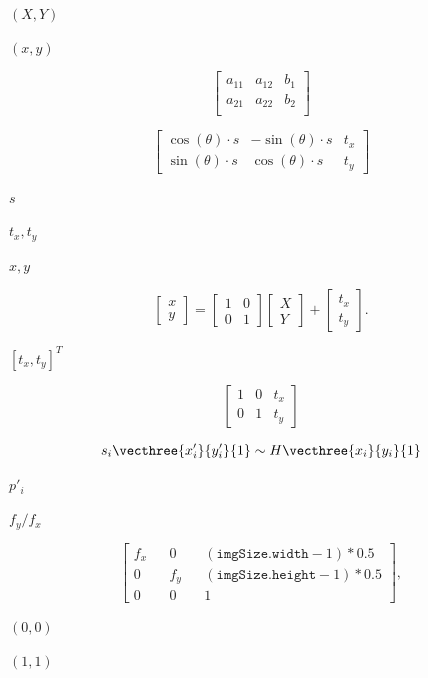 \documentclass{article}
\begin{document}
$(X,Y)$
\pagebreak

$(x,y)$
\pagebreak

\[\begin{bmatrix}
a_{11} & a_{12} & b_1\\
a_{21} & a_{22} & b_2\\
\end{bmatrix}
\]
\pagebreak

\[ \begin{bmatrix} \cos(\theta) \cdot s & -\sin(\theta) \cdot s & t_x \\
                \sin(\theta) \cdot s & \cos(\theta) \cdot s & t_y
\end{bmatrix} \]
\pagebreak

$ s $
\pagebreak

$ t_x, t_y $
\pagebreak

$ x, y $
\pagebreak

\[\begin{bmatrix}
x\\
y
\end{bmatrix}
=
\begin{bmatrix}
1 & 0\\
0 & 1
\end{bmatrix}
\begin{bmatrix}
X\\
Y
\end{bmatrix}
+
\begin{bmatrix}
t_x\\
t_y
\end{bmatrix}.
\]
\pagebreak

$[t_x, t_y]^T$
\pagebreak

\[\begin{bmatrix}
1 & 0 & t_x\\
0 & 1 & t_y
\end{bmatrix}
\]
\pagebreak

\[s_i \vecthree{x'_i}{y'_i}{1} \sim H \vecthree{x_i}{y_i}{1}\]
\pagebreak

$p'_i$
\pagebreak

$f_y/f_x$
\pagebreak

\[\begin{bmatrix} f_x && 0 && ( \texttt{imgSize.width} -1)*0.5  \\ 0 && f_y && ( \texttt{imgSize.height} -1)*0.5  \\ 0 && 0 && 1 \end{bmatrix} ,\]
\pagebreak

$(0,0)$
\pagebreak

$(1,1)$
\pagebreak
\end{document}

